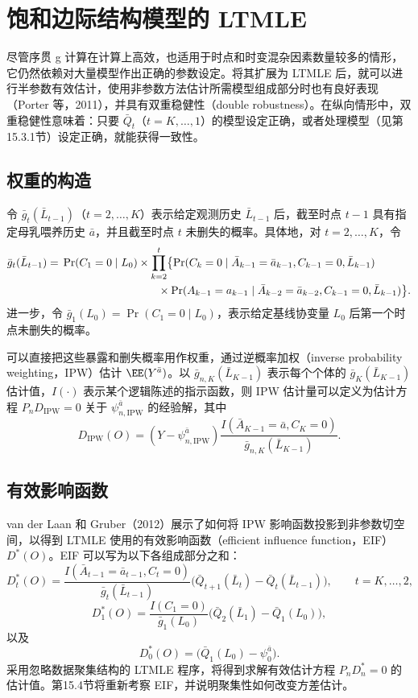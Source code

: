 \section{饱和边际结构模型的 LTMLE}

尽管序贯 g 计算在计算上高效，也适用于时点和时变混杂因素数量较多的情形，它仍然依赖对大量模型作出正确的参数设定。将其扩展为 LTMLE 后，就可以进行半参数有效估计，使用非参数方法估计所需模型组成部分时也有良好表现（Porter 等，2011），并具有双重稳健性（double robustness）。在纵向情形中，双重稳健性意味着：只要 $\bar Q_t$（$t=K,\ldots,1$）的模型设定正确，或者处理模型（见第15.3.1节）设定正确，就能获得一致性。

\subsection{权重的构造}

令 $\bar g_t(\bar L_{t-1})$（$t=2,\ldots,K$）表示给定观测历史 $\bar L_{t-1}$ 后，截至时点 $t-1$ 具有指定母乳喂养历史 $\bar a$，并且截至时点 $t$ 未删失的概率。具体地，对 $t=2,\ldots,K$，令
\[
\begin{aligned}
 \bar g_t(\bar L_{t-1})={}&\Pr(C_1=0\mid L_0)
 \times\prod_{k=2}^{t}\bigl\{
 \Pr(C_k=0\mid\bar A_{k-1}=\bar a_{k-1},C_{k-1}=0,\bar L_{k-1})\\
 &\hspace{3.1cm}\times\Pr(A_{k-1}=a_{k-1}\mid
 \bar A_{k-2}=\bar a_{k-2},C_{k-1}=0,\bar L_{k-1})\bigr\}.
\end{aligned}
\]
进一步，令 $\bar g_1(L_0)=\Pr(C_1=0\mid L_0)$，表示给定基线协变量 $L_0$ 后第一个时点未删失的概率。

可以直接把这些暴露和删失概率用作权重，通过逆概率加权（inverse probability weighting，IPW）估计 $\EE(Y^{\bar a})$。以 $\bar g_{n,K}(\bar L_{K-1})$ 表示每个个体的 $\bar g_K(\bar L_{K-1})$ 估计值，$I(\cdot)$ 表示某个逻辑陈述的指示函数，则 IPW 估计量可以定义为估计方程 $P_nD_{\mathrm{IPW}}=0$ 关于 $\psi_{n,\mathrm{IPW}}^{\bar a}$ 的经验解，其中
\[
 D_{\mathrm{IPW}}(O)=
 (Y-\psi_{n,\mathrm{IPW}}^{\bar a})
 \frac{I(\bar A_{K-1}=\bar a,C_K=0)}{\bar g_{n,K}(\bar L_{K-1})}.
\]

\subsection{有效影响函数}

van der Laan 和 Gruber（2012）展示了如何将 IPW 影响函数投影到非参数切空间，以得到 LTMLE 使用的有效影响函数（efficient influence function，EIF）$D^*(O)$。EIF 可以写为以下各组成部分之和：
\[
 D_t^*(O)=\frac{I(\bar A_{t-1}=\bar a_{t-1},C_t=0)}{\bar g_t(\bar L_{t-1})}
 \bigl(\bar Q_{t+1}(\bar L_t)-\bar Q_t(\bar L_{t-1})\bigr),
 \qquad t=K,\ldots,2,
\]
\[
 D_1^*(O)=\frac{I(C_1=0)}{\bar g_1(L_0)}
 \bigl(\bar Q_2(\bar L_1)-\bar Q_1(L_0)\bigr),
\]
以及
\[
 D_0^*(O)=\bigl(\bar Q_1(L_0)-\psi_0^{\bar a}\bigr).
\]
采用忽略数据聚集结构的 LTMLE 程序，将得到求解有效估计方程 $P_nD_n^*=0$ 的估计值。第15.4节将重新考察 EIF，并说明聚集性如何改变方差估计。

